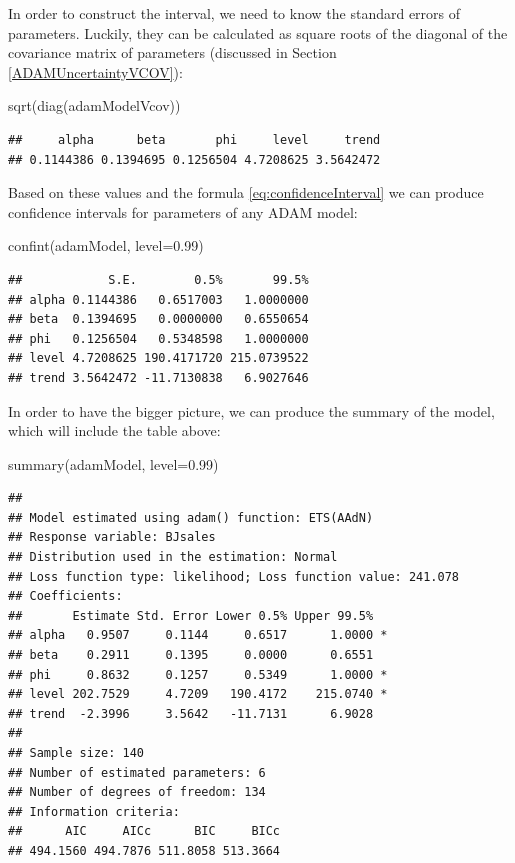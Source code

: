 \documentclass[
]{book}
\newenvironment{Shaded}{\begin{snugshade}}{\end{snugshade}}
\newcommand{\AttributeTok}[1]{\textcolor[rgb]{0.77,0.63,0.00}{#1}}
\newcommand{\FloatTok}[1]{\textcolor[rgb]{0.00,0.00,0.81}{#1}}
\newcommand{\FunctionTok}[1]{\textcolor[rgb]{0.00,0.00,0.00}{#1}}
\newcommand{\NormalTok}[1]{#1}
\theoremstyle{definition}
\theoremstyle{definition}
\theoremstyle{definition}
\theoremstyle{definition}
\theoremstyle{remark}
\begin{document}
In order to construct the interval, we need to know the standard errors of parameters. Luckily, they can be calculated as square roots of the diagonal of the covariance matrix of parameters (discussed in Section \ref{ADAMUncertaintyVCOV}):

\begin{Shaded}
\begin{Highlighting}[]
\FunctionTok{sqrt}\NormalTok{(}\FunctionTok{diag}\NormalTok{(adamModelVcov))}
\end{Highlighting}
\end{Shaded}

\begin{verbatim}
##     alpha      beta       phi     level     trend 
## 0.1144386 0.1394695 0.1256504 4.7208625 3.5642472
\end{verbatim}

Based on these values and the formula \eqref{eq:confidenceInterval} we can produce confidence intervals for parameters of any ADAM model:

\begin{Shaded}
\begin{Highlighting}[]
\FunctionTok{confint}\NormalTok{(adamModel, }\AttributeTok{level=}\FloatTok{0.99}\NormalTok{)}
\end{Highlighting}
\end{Shaded}

\begin{verbatim}
##            S.E.        0.5%       99.5%
## alpha 0.1144386   0.6517003   1.0000000
## beta  0.1394695   0.0000000   0.6550654
## phi   0.1256504   0.5348598   1.0000000
## level 4.7208625 190.4171720 215.0739522
## trend 3.5642472 -11.7130838   6.9027646
\end{verbatim}

In order to have the bigger picture, we can produce the summary of the model, which will include the table above:

\begin{Shaded}
\begin{Highlighting}[]
\FunctionTok{summary}\NormalTok{(adamModel, }\AttributeTok{level=}\FloatTok{0.99}\NormalTok{)}
\end{Highlighting}
\end{Shaded}

\begin{verbatim}
## 
## Model estimated using adam() function: ETS(AAdN)
## Response variable: BJsales
## Distribution used in the estimation: Normal
## Loss function type: likelihood; Loss function value: 241.078
## Coefficients:
##       Estimate Std. Error Lower 0.5% Upper 99.5%  
## alpha   0.9507     0.1144     0.6517      1.0000 *
## beta    0.2911     0.1395     0.0000      0.6551  
## phi     0.8632     0.1257     0.5349      1.0000 *
## level 202.7529     4.7209   190.4172    215.0740 *
## trend  -2.3996     3.5642   -11.7131      6.9028  
## 
## Sample size: 140
## Number of estimated parameters: 6
## Number of degrees of freedom: 134
## Information criteria:
##      AIC     AICc      BIC     BICc 
## 494.1560 494.7876 511.8058 513.3664
\end{verbatim}
\end{document}
